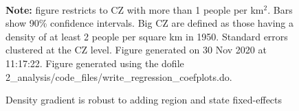 \begin{figure}[!h]
\centering
\caption{Density gradient is robust to adding region and state fixed-effects}
\label{fig:big_CZ}
  \\ 
\par \begin{minipage}[h]{\textwidth}{\tiny\textbf{Note:} figure restricts to CZ with more than 1 people per km$^2$. Bars show 90\% confidence intervals. Big CZ are defined as those having a density of at least 2 people per square km in 1950. Standard errors clustered at the CZ level. Figure generated on 30 Nov 2020 at 11:17:22. Figure generated using the dofile 2\_analysis/code\_files/write\_regression\_coefplots.do.}\end{minipage}
\end{figure}
